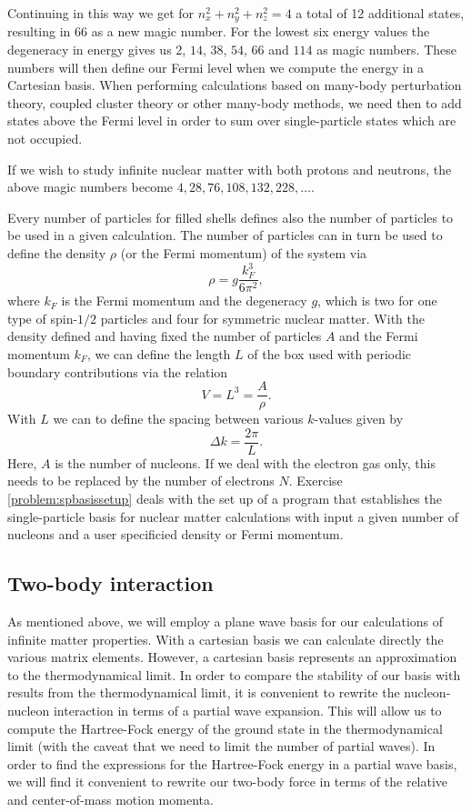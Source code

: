 \documentclass[thesis.tex]{subfiles}
\begin{document}
Continuing in this way we get for $n_{x}^{2}+n_{y}^{2}+n_{z}^{2}=4$ a
total of 12 additional states, resulting in $66$ as a new magic
number. For the lowest six energy values the degeneracy in energy
gives us $2$, $14$, $38$, $54$, $66$ and $114$ as magic numbers. These
numbers will then define our Fermi level when we compute the energy in
a Cartesian basis. When performing calculations based on many-body
perturbation theory, coupled cluster theory or other many-body
methods, we need then to add states above the Fermi level in order to
sum over single-particle states which are not occupied.

If we wish to study infinite nuclear matter with both protons and
neutrons, the above magic numbers become $4, 28, 76, 108, 132, 228,
\dots$.

Every number of particles for filled shells defines also the number of
particles to be used in a given calculation. The number of particles
can in turn be used to define the density $\rho$ (or the Fermi momentum)
of the system via
\[
\rho = g \frac{k_F^3}{6\pi^2},
\]
where $k_F$ is the Fermi momentum and the degeneracy $g$, which is two
for one type of spin-$1/2$ particles and four for symmetric nuclear
matter.  With the density defined and having fixed the number of
particles $A$ and the Fermi momentum $k_F$, we can define the length
$L$ of the box used with periodic boundary contributions via the
relation
\[
  V= L^3= \frac{A}{\rho}.
\]
With $L$ we can to define the spacing between various
$k$-values given by
\[
  \Delta k = \frac{2\pi}{L}.
\]
Here, $A$ is the number of nucleons. If we deal with the electron
gas only, this needs to be replaced by the number of electrons $N$.
Exercise \ref{problem:spbasissetup} deals with the set up of a program
that establishes the single-particle basis for nuclear matter
calculations with input a given number of nucleons and a user
specificied density or Fermi momentum. 

\subsection{Two-body interaction\label{sec:interaction}}

As mentioned above, we will employ a plane wave basis for our
calculations of infinite matter properties. With a cartesian basis
we can calculate directly the various matrix elements. 
However, a cartesian basis
represents an approximation to the thermodynamical limit. In order to
compare the stability of our basis with results from the
thermodynamical limit, it is convenient to rewrite the nucleon-nucleon
interaction in terms of a partial wave expansion. This will allow us
to compute the Hartree-Fock energy of the ground state in the
thermodynamical limit (with the caveat that we need to limit the
number of partial waves). In order to find the expressions for the
Hartree-Fock energy in a partial wave basis, we will find it
convenient to rewrite our two-body force in terms of the relative and
center-of-mass motion momenta.
\end{document}
